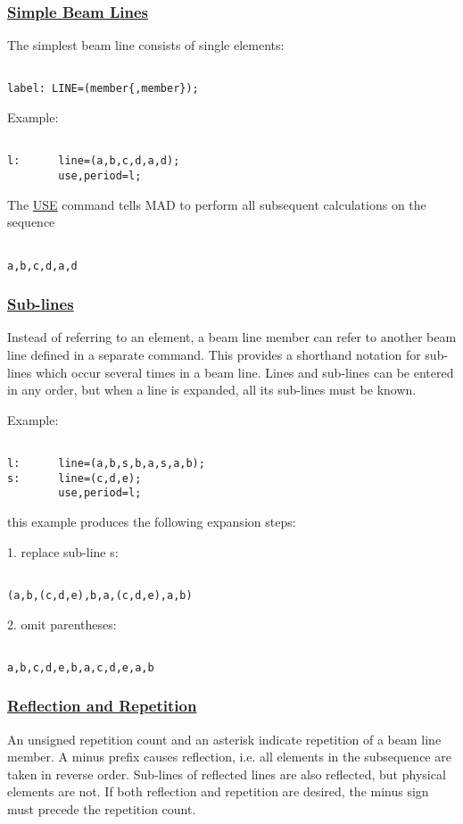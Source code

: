 \subsubsection{\href{simple}{Simple Beam Lines}} The simplest beam line consists of single elements: 
\begin{verbatim}

label: LINE=(member{,member});
\end{verbatim} Example: 
\begin{verbatim}

l:      line=(a,b,c,d,a,d);
        use,period=l;
\end{verbatim} The \href{../control/general.html#use}{USE} command tells MAD to perform all subsequent calculations on the sequence 
\begin{verbatim}

a,b,c,d,a,d
\end{verbatim}

\subsubsection{\href{subline}{Sub-lines}} Instead of referring to an element, a beam line member can refer to another beam line defined in a separate command. This provides a shorthand notation for sub-lines which occur several times in a beam line. Lines and sub-lines can be entered in any order, but when a line is expanded, all its sub-lines must be known. 

 Example: 
\begin{verbatim}

l:      line=(a,b,s,b,a,s,a,b);
s:      line=(c,d,e);
        use,period=l;
\end{verbatim} this example produces the following expansion steps: 

1. replace sub-line s: 
\begin{verbatim}

(a,b,(c,d,e),b,a,(c,d,e),a,b)
\end{verbatim}

2. omit parentheses: 
\begin{verbatim}

a,b,c,d,e,b,a,c,d,e,a,b
\end{verbatim}

\subsubsection{\href{reflect}{Reflection and Repetition}} An unsigned repetition count and an asterisk indicate repetition of a beam line member. A minus prefix causes reflection, i.e. all elements in the subsequence are taken in reverse order. Sub-lines of reflected lines are also reflected, but physical elements are not. If both reflection and repetition are desired, the minus sign must precede the repetition count. 

